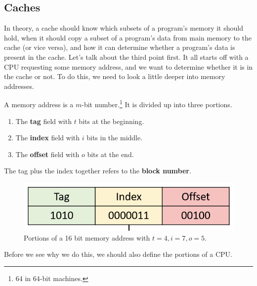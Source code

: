 \documentclass{article}
\begin{document}
  \subsection{Caches}

      In theory, a cache should know which subsets of a program's memory it should hold, when it should copy a subset of a program's data from main memory to the cache (or vice versa), and how it can determine whether a program's data is present in the cache. Let's talk about the third point first. It all starts off with a CPU requesting some memory address, and we want to determine whether it is in the cache or not. To do this, we need to look a little deeper into memory addresses. 

      \begin{definition}
        A memory address is a $m$-bit number.\footnote{64 in 64-bit machines.} It is divided up into three portions. 
        \begin{enumerate}
          \item The \textbf{tag} field with $t$ bits at the beginning.
          \item The \textbf{index} field with $i$ bits in the middle. 
          \item The \textbf{offset} field with $o$ bits at the end.
        \end{enumerate}
        The tag plus the index together refers to the \textbf{block number}. 
        \begin{figure}[H]
          \centering 
          \includegraphics[scale=0.4]{img/memory_portions.png}
          \caption{Portions of a 16 bit memory address with $t = 4, i = 7, o = 5$. } 
          \label{fig:memory_portions}
        \end{figure}
      \end{definition}

      Before we see why we do this, we should also define the portions of a CPU. 
\end{document}
